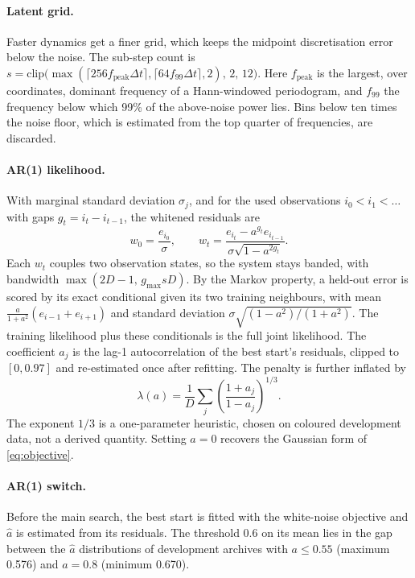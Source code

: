 \paragraph{Latent grid.} Faster dynamics get a finer grid, which keeps the midpoint discretisation error below the noise. The sub-step count is $s=\mathrm{clip}\bigl(\max(\lceil 256 f_{\mathrm{peak}}\Delta t\rceil,\lceil 64 f_{99}\Delta t\rceil, 2),\,2,\,12\bigr)$. Here $f_{\mathrm{peak}}$ is the largest, over coordinates, dominant frequency of a Hann-windowed periodogram, and $f_{99}$ the frequency below which 99\% of the above-noise power lies. Bins below ten times the noise floor, which is estimated from the top quarter of frequencies, are discarded.

\paragraph{AR(1) likelihood.} With marginal standard deviation $\sigma_j$, and for the used observations $i_0<i_1<\dots$ with gaps $g_t=i_t-i_{t-1}$, the whitened residuals are
\begin{equation}
w_0 = \frac{e_{i_0}}{\sigma},\qquad w_t=\frac{e_{i_t}-a^{g_t}e_{i_{t-1}}}{\sigma\sqrt{1-a^{2g_t}}}.
\end{equation}
Each $w_t$ couples two observation states, so the system stays banded, with bandwidth $\max(2D-1,\,g_{\max}sD)$. By the Markov property, a held-out error is scored by its exact conditional given its two training neighbours, with mean $\frac{a}{1+a^2}(e_{i-1}+e_{i+1})$ and standard deviation $\sigma\sqrt{(1-a^2)/(1+a^2)}$. The training likelihood plus these conditionals is the full joint likelihood. The coefficient $a_j$ is the lag-1 autocorrelation of the best start's residuals, clipped to $[0,0.97]$ and re-estimated once after refitting. The penalty is further inflated by
\begin{equation}
\lambda(a)=\frac1D\sum_j\left(\frac{1+a_j}{1-a_j}\right)^{1/3}.
\label{eq:lambda}
\end{equation}
The exponent $1/3$ is a one-parameter heuristic, chosen on coloured development data, not a derived quantity. Setting $a=0$ recovers the Gaussian form of \eqref{eq:objective}.

\paragraph{AR(1) switch.} Before the main search, the best start is fitted with the white-noise objective and $\hat a$ is estimated from its residuals. The threshold $0.6$ on its mean lies in the gap between the $\hat a$ distributions of development archives with $a\le0.55$ (maximum 0.576) and $a=0.8$ (minimum 0.670).

